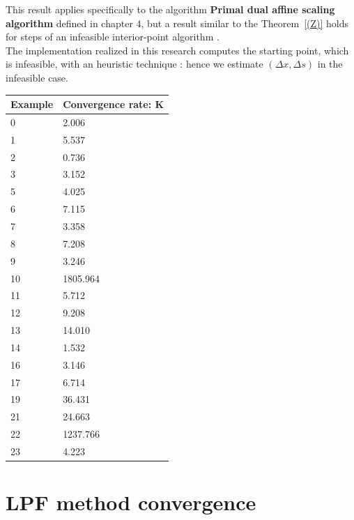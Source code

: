 \documentclass[a4paper,10 pt,titlepage,twoside]{book}
\theoremstyle{plain}
\theoremstyle{definition}
\theoremstyle{remark}
\begin{document}
This result applies specifically to the algorithm \textbf{Primal dual affine scaling  algorithm} defined in chapter 4, but a result similar to the Theorem~\ref{(Z)} holds for steps of an infeasible interior-point algorithm \cite{Wright}.\\ The implementation realized in this research computes the starting point, which is infeasible, with an heuristic technique \cite{MER}: hence we estimate $(\Delta x, \Delta s)$ in the infeasible case.
\begin{table}[]
\begin{center}
	\begin{tabular}{|l|l|}
		\hline
		{Example} & {\color[HTML]{333333} Convergence rate: K} \\ \hline
		0 & 2.006 \\
		1 & 5.537 \\
		2 & 0.736 \\
		3 & 3.152 \\
		5 & 4.025 \\
		6 & 7.115 \\
		7 & 3.358 \\
		8 & 7.208 \\
		9 & 3.246 \\
		10 & 1805.964 \\
		11 & 5.712 \\
		12 & 9.208 \\
		13 & 14.010 \\
		14 & 1.532 \\
		16 & 3.146 \\
		17 & 6.714 \\
		19 & 36.431 \\
		21 & 24.663 \\
		22 & 1237.766 \\
		23 & 4.223  \\ \hline
	\end{tabular}
\end{center}
\end{table}

\section{LPF method convergence}
\end{document}
